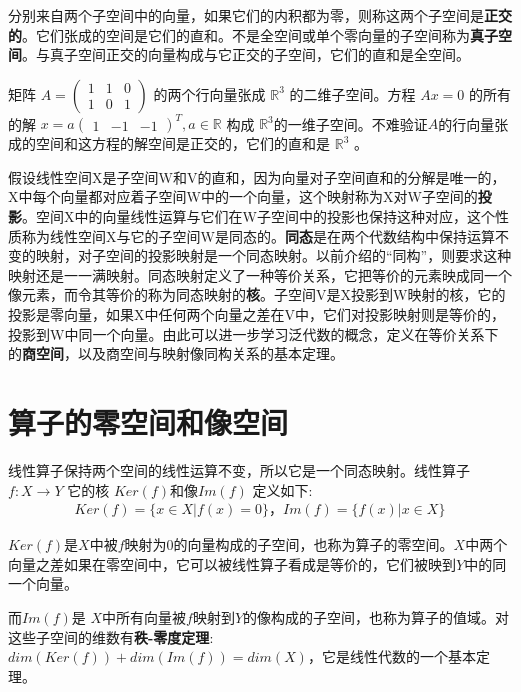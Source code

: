 	分别来自两个子空间中的向量，如果它们的内积都为零，则称这两个子空间是\textbf{正交的}。它们张成的空间是它们的直和。不是全空间或单个零向量的子空间称为\textbf{真子空间}。与真子空间正交的向量构成与它正交的子空间，它们的直和是全空间。
	
	\kaishu
	
	矩阵   $ A=\begin{pmatrix} 1&1&0 \\1&0 &1\end{pmatrix} $  的两个行向量张成  $ \mathbb{R}^3 $ 的二维子空间。方程 $ Ax=0 $ 的所有的解 $ x= a\begin{pmatrix}1&-1&-1 \end{pmatrix}^T,a\in \mathbb{R} $  构成 $ \mathbb{R}^3 $的一维子空间。不难验证$ A $的行向量张成的空间和这方程的解空间是正交的，它们的直和是  $ \mathbb{R}^3 $ 。
	
	\songti
	
	假设线性空间X是子空间W和V的直和，因为向量对子空间直和的分解是唯一的， X中每个向量都对应着子空间W中的一个向量，这个映射称为X对W子空间的\textbf{投影}。空间X中的向量线性运算与它们在W子空间中的投影也保持这种对应，这个性质称为线性空间X与它的子空间W是同态的。\textbf{同态}是在两个代数结构中保持运算不变的映射，对子空间的投影映射是一个同态映射。以前介绍的``同构''，则要求这种映射还是一一满映射。同态映射定义了一种等价关系，它把等价的元素映成同一个像元素，而令其等价的称为同态映射的\textbf{核}。子空间V是X投影到W映射的核，它的投影是零向量，如果X中任何两个向量之差在V中，它们对投影映射则是等价的，投影到W中同一个向量。由此可以进一步学习泛代数的概念，定义在等价关系下的\textbf{商空间}，以及商空间与映射像同构关系的基本定理。
	
	\section{算子的零空间和像空间}
	
	线性算子保持两个空间的线性运算不变，所以它是一个同态映射。线性算子$  f:X \to Y $ 它的核 $ Ker(f)  $和像$  Im(f) $  定义如下:
	\begin{gather*}
		Ker(f) = \{ x\in X | f(x)= 0 \} ，Im (f) = \{f (x)| x \in X\}  
	\end{gather*}

	$ Ker(f)  $是$  X  $中被$ f $映射为0的向量构成的子空间，也称为算子的零空间。$ X $中两个向量之差如果在零空间中，它可以被线性算子看成是等价的，它们被映到$ Y $中的同一个向量。
	
	而$ Im(f)  $是 $ X $中所有向量被$ f $映射到$ Y $的像构成的子空间，也称为算子的值域。对这些子空间的维数有\textbf{秩-零度定理}:  $ dim(Ker(f))+dim (Im(f))=dim(X) $，它是线性代数的一个基本定理。
	
